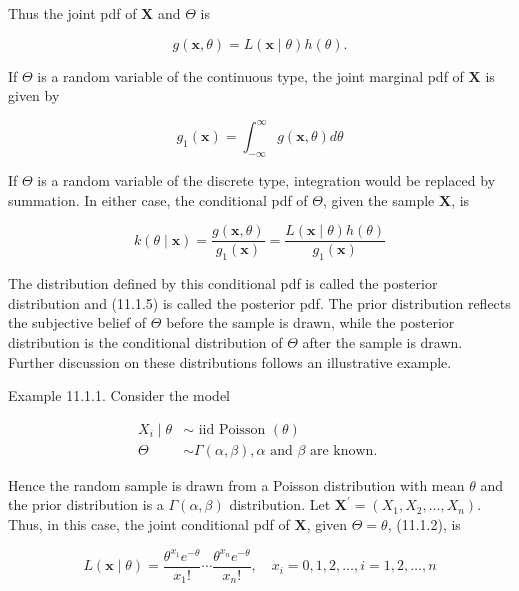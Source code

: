 Thus the joint pdf of $\mathbf{X}$ and $\Theta$ is


\begin{equation*}
g(\mathbf{x}, \theta)=L(\mathbf{x} \mid \theta) h(\theta) . \tag{11.1.3}
\end{equation*}


If $\Theta$ is a random variable of the continuous type, the joint marginal pdf of $\mathbf{X}$ is given by


\begin{equation*}
g_{1}(\mathbf{x})=\int_{-\infty}^{\infty} g(\mathbf{x}, \theta) d \theta \tag{11.1.4}
\end{equation*}


If $\Theta$ is a random variable of the discrete type, integration would be replaced by summation. In either case, the conditional pdf of $\Theta$, given the sample $\mathbf{X}$, is


\begin{equation*}
k(\theta \mid \mathbf{x})=\frac{g(\mathbf{x}, \theta)}{g_{1}(\mathbf{x})}=\frac{L(\mathbf{x} \mid \theta) h(\theta)}{g_{1}(\mathbf{x})} \tag{11.1.5}
\end{equation*}


The distribution defined by this conditional pdf is called the posterior distribution and (11.1.5) is called the posterior pdf. The prior distribution reflects the subjective belief of $\Theta$ before the sample is drawn, while the posterior distribution is the conditional distribution of $\Theta$ after the sample is drawn. Further discussion on these distributions follows an illustrative example.

Example 11.1.1. Consider the model

$$
\begin{aligned}
X_{i} \mid \theta & \sim \text { iid Poisson }(\theta) \\
\Theta & \sim \Gamma(\alpha, \beta), \alpha \text { and } \beta \text { are known. }
\end{aligned}
$$

Hence the random sample is drawn from a Poisson distribution with mean $\theta$ and the prior distribution is a $\Gamma(\alpha, \beta)$ distribution. Let $\mathbf{X}^{\prime}=\left(X_{1}, X_{2}, \ldots, X_{n}\right)$. Thus, in this case, the joint conditional pdf of $\mathbf{X}$, given $\Theta=\theta$, (11.1.2), is

$$
L(\mathbf{x} \mid \theta)=\frac{\theta^{x_{1}} e^{-\theta}}{x_{1}!} \cdots \frac{\theta^{x_{n}} e^{-\theta}}{x_{n}!}, \quad x_{i}=0,1,2, \ldots, i=1,2, \ldots, n
$$


